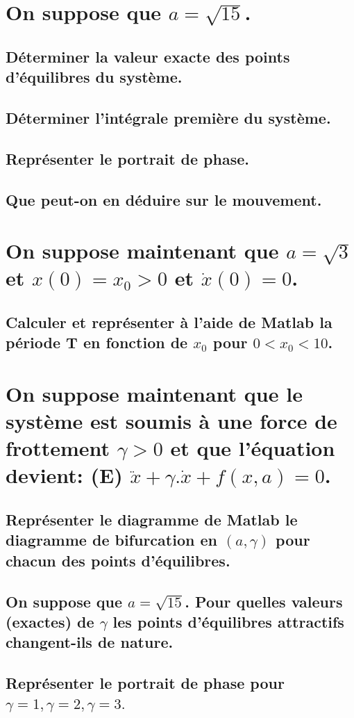 \documentclass[10pt,a4paper]{article}
\begin{document}
\section{On suppose que $a=\sqrt{15}$.}
\subsection{Déterminer la valeur exacte des points d'équilibres du système.}
\subsection{Déterminer l'intégrale première du système.}
\subsection{Représenter le portrait de phase.}
\subsection{Que peut-on en déduire sur le mouvement.}

\section{On suppose maintenant que $a=\sqrt{3}$ et $x(0)=x_0>0$ et $\dot{x}(0)=0$.}
\subsection{Calculer et représenter à l'aide de Matlab la période T en fonction de $x_0$ pour $0<x_0<10$.}

\section{On suppose maintenant que le système est soumis à une force de frottement $\gamma > 0$ et que l'équation devient: (E) $\ddot{x} + \gamma.\dot{x} + f(x,a) = 0$.}
\subsection{Représenter le diagramme de Matlab le diagramme de bifurcation  en $(a,\gamma)$ pour chacun des points d'équilibres.}
\subsection{On suppose que $a=\sqrt{15}$. Pour quelles valeurs (exactes) de $\gamma$ les points d'équilibres attractifs changent-ils de nature.}
\subsection{Représenter le portrait de phase pour $\gamma=1, \gamma=2, \gamma=3.$}
\end{document}
